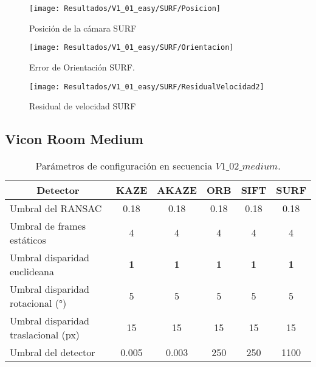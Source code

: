 \begin{figure}[H]
	\centering
	\texttt{[image: Resultados/V1\_01\_easy/SURF/Posicion]}
	\caption{Posición de la cámara SURF}
	\label{imagen:Resultados/V1_01_easy/SURF/Posicion}
\end{figure}


\begin{figure}[H]
	\centering
	\texttt{[image: Resultados/V1\_01\_easy/SURF/Orientacion]}
	\caption[Error de Orientación SURF]{Error de Orientación SURF.}
	\label{imagen:Resultados/V1_01_easy/SURF/Orientacion}
\end{figure}



\begin{figure}[H]
	\centering
	\texttt{[image: Resultados/V1\_01\_easy/SURF/ResidualVelocidad2]}
	\caption{Residual de velocidad SURF}
	\label{imagen:Resultados/V1_01_easy/SURF/ResidualVelocidad}
\end{figure}




\subsection{Vicon Room Medium}


\begin{table}[htbp]
	\caption{Parámetros de configuración  en secuencia $V1\_ 02\_ medium$.}
	\begin{tabular}{|l|c|c|c|c|c|}
		\hline
		\multicolumn{1}{|c|}{\textbf{Detector}} & \textbf{KAZE} & \textbf{AKAZE} & \textbf{ORB} & \textbf{SIFT} & \textbf{SURF} \\ \hline
		Umbral del RANSAC & 0.18 & 0.18 & 0.18 & 0.18 & 0.18 \\ \hline
		Umbral de frames estáticos & 4 & 4 & 4 & 4 & 4 \\ \hline
		Umbral disparidad euclideana & \textbf{1} & \textbf{1} & \textbf{1} & \textbf{1} & \textbf{1} \\ \hline
		Umbral disparidad rotacional (°) & 5 & 5 & 5 & 5 & 5 \\ \hline
		Umbral disparidad traslacional (px) & 15 & 15 & 15 & 15 & 15 \\ \hline
		Umbral del detector & 0.005 & 0.003 & 250 & 250 & 1100 \\ \hline
	\end{tabular}
	\label{Tabla/Parametros/V1_02_medium}
\end{table}

